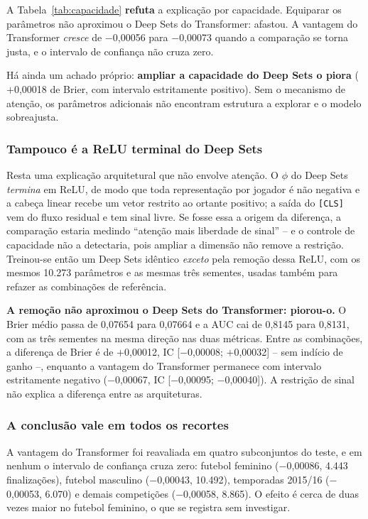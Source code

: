 \documentclass[12pt]{article}
\begin{document}
A Tabela~\ref{tab:capacidade} \textbf{refuta} a explicação por capacidade. Equiparar os parâmetros
não aproximou o Deep Sets do Transformer: afastou. A vantagem do Transformer
\emph{cresce} de $-$0,00056 para $-$0,00073 quando a comparação se torna justa, e
o intervalo de confiança não cruza zero.

Há ainda um achado próprio: \textbf{ampliar a capacidade do Deep Sets o piora}
($+$0,00018 de Brier, com intervalo estritamente positivo). Sem o mecanismo de
atenção, os parâmetros adicionais não encontram estrutura a explorar e o modelo
sobreajusta.

\subsubsection*{Tampouco é a ReLU terminal do Deep Sets}

Resta uma explicação arquitetural que não envolve atenção. O $\phi$ do Deep Sets
\emph{termina} em ReLU, de modo que toda representação por jogador é não
negativa e a cabeça linear recebe um vetor restrito ao ortante positivo; a saída
do \texttt{[CLS]} vem do fluxo residual e tem sinal livre. Se fosse essa a
origem da diferença, a comparação estaria medindo ``atenção mais liberdade de
sinal'' -- e o controle de capacidade não a detectaria, pois ampliar a dimensão
não remove a restrição. Treinou-se então um Deep Sets idêntico \emph{exceto}
pela remoção dessa ReLU, com os mesmos 10.273 parâmetros e as mesmas três
sementes, usadas também para refazer as combinações de referência.

\textbf{A remoção não aproximou o Deep Sets do Transformer: piorou-o.} O Brier
médio passa de 0,07654 para 0,07664 e a AUC cai de 0,8145 para 0,8131, com as
três sementes na mesma direção nas duas métricas. Entre as combinações, a
diferença de Brier é de $+$0,00012, IC [$-$0,00008; $+$0,00032] -- sem indício
de ganho --, enquanto a vantagem do Transformer permanece com intervalo
estritamente negativo ($-$0,00067, IC [$-$0,00095; $-$0,00040]). A restrição de
sinal não explica a diferença entre as arquiteturas.

\subsubsection*{A conclusão vale em todos os recortes}

A vantagem do Transformer foi reavaliada em quatro subconjuntos do teste, e em
nenhum o intervalo de confiança cruza zero: futebol feminino ($-$0,00086, 4.443
finalizações), futebol masculino ($-$0,00043, 10.492), temporadas 2015/16
($-$0,00053, 6.070) e demais competições ($-$0,00058, 8.865). O efeito é cerca de
duas vezes maior no futebol feminino, o que se registra sem investigar.
\end{document}
